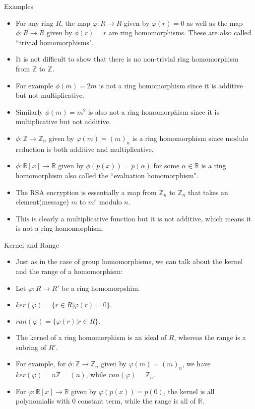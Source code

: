 \documentclass[ %
 10pt, xcolor={dvipsnames,svgnames,x11names,hyperref},
   hyperref={colorlinks=true,citecolor=green,linkcolor=DarkRed,urlcolor=ProcessBlue,anchorcolor=blue}
  ]{beamer}
\newenvironment{stepitemize}{\begin{itemize}[<+->]}{\end{itemize} }
\newcommand{\Z}{\mathbb{Z}}
\newcommand{\R}{\mathbb{R}}
\begin{document}
\begin{frame}{Examples}
\begin{stepitemize}
\item For any ring $R$, the map $\varphi:R \rightarrow R$ given by $\varphi(r)=0$ as well as the map $\phi:R \rightarrow R$ given by $\phi(r)=r$ are ring homomorphisms. These are also called ``trivial homomorphisms".
    \item It is not difficult to show that there is no non-trivial ring homomorphism from $\Z$ to $\Z$.
    \item For example $\phi(m)=2m$ is not a ring homomorphism since it is additive but not multiplicative.
    \item Similarly $\phi(m)=m^2$ is also not a ring homomorphism since it is multiplicative but not additive.
    \item $\phi:\Z \rightarrow \Z_n$ given by $\varphi(m)=(m)_n$ is a ring homomorphism since modulo reduction is both additive and multiplicative.
    \item $\phi:\R[x]\rightarrow \R$ given by $\phi(p(x)) = p(\alpha)$ for some $\alpha \in \R$ is a ring homomorphism also called the ``evaluation homomorphism".
   \item The RSA encryption is essentially a map from $\Z_n$ to $\Z_n$ that takes an element(message) $m$ to $m^e$ modulo $n$.
   \item This is clearly a multiplicative function but it is not additive, which means it is not a ring homomorphism.
\end{stepitemize}
\end{frame}

\begin{frame}{Kernel and Range}
\begin{stepitemize}
\item Just as in the case of group homomorphisms, we can talk about the kernel and the range of a homomorphism:
\item Let $\varphi:R\rightarrow R'$ be a ring homomorpshim. \item $ker(\varphi) = \{r\in R|\varphi(r)=0\}.$
\item $ran(\varphi) = \{\varphi(r)|r\in R\}.$
\item The kernel of a ring homomorphism is an ideal of $R$, whereas the range is a subring of $R'$.
\item For example, for $\phi:\Z \rightarrow \Z_n$ given by $\varphi(m)=(m)_n$, we have $ker(\varphi) = n\Z = (n)$, while $ran(\varphi) = \Z_n$.
\item For $\varphi:\R[x]\rightarrow \R$ given by $\varphi(p(x))=p(0)$, the kernel is all polynomialis with $0$ constant term, while the range is all of $\R$.
\end{stepitemize}
\end{frame}
\end{document}
